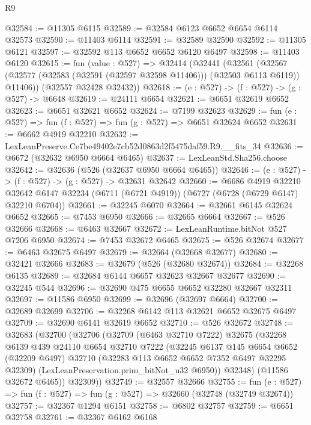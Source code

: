 \begin{lexlean}{R9}
\begin{coremodule}
@32584 := @11305 @6115
@32589 := @32584 @6123 @6652 @6654 @6114 @32573
@32590 := @11403 @6114
@32591 := @32589 @32590
@32592 := @11305 @6121
@32597 := @32592 @113 @6652 @6652 @6120 @6497
@32598 := @11403 @6120
@32615 := fun (value : @527) =>
  @32414
    (@32441
      (@32561
        (@32567 (@32577 (@32583 (@32591 (@32597 @32598 @11406))) (@32503 @6113 @6119)) @11406))
      (@32557 @32428 @32432))
@32618 := (e : @527) -> (f : @527) -> (g : @527) -> @6648
@32619 := @24111 @6654
@32621 := @6651 @32619 @6652
@32623 := @6651 @32621 @6652
@32624 := @7199 @32623
@32629 := fun (e : @527) => fun (f : @527) => fun (g : @527) => @6651 @32624 @6652
@32631 := @6662 @4919 @32210
@32632 := LexLeanPreserve.Ce7be49402e7cb52d0863d2f5475daf59.R9.__fits_34
@32636 := @6672 (@32632 @6950 @6664 @6465)
@32637 := LexLeanStd.Sha256.choose
@32642 := @32636 (@526 (@32637 @6950 @6664 @6465))
@32646 := (e : @527) -> (f : @527) -> (g : @527) -> @32631 @32642
@32660 := @6686
    @4919
    @32210
    @32642
    @6147
    @32234
    (@6711 (@6721 @4919))
    (@6727 (@6728 (@6729 @6147) @32210 @6704))
@32661 := @32245 @6070
@32664 := @32661 @6145 @32624 @6652
@32665 := @7453 @6950
@32666 := @32665 @6664
@32667 := @526 @32666
@32668 := @6463 @32667
@32672 := LexLeanRuntime.bitNot @527 @7206 @6950
@32674 := @7453 @32672 @6465
@32675 := @526 @32674
@32677 := @6463 @32675 @6497
@32679 := @32664 (@32668 @32677)
@32680 := @32421 @32666
@32683 := @32679 (@526 (@32680 @32674))
@32684 := @32268 @6135
@32689 := @32684 @6144 @6657 @32623 @32667 @32677
@32690 := @32245 @544
@32696 := @32690 @475 @6655 @6652 @32280 @32667 @32311
@32697 := @11586 @6950
@32699 := @32696 (@32697 @6664)
@32700 := @32689 @32699
@32706 := @32268 @6142 @113 @32621 @6652 @32675 @6497
@32709 := @32690 @6141 @32619 @6652
@32710 := @526 @32672
@32748 := @32683
    (@32700
      (@32706
        (@32709
          (@6463 @32710 @7222)
          @32675
          (@32268
            @6139
            @439
            @24110
            @6654
            @32710
            @7222
            (@32245
              @6137
              @145
              @6654
              @6652
              (@32209 @6497)
              @32710
              (@32283 @113 @6652 @6652 @7352 @6497 @32295 @32309)
              (LexLeanPreservation.prim_bitNot_u32 @6950))
            @32348)
          (@11586 @32672 @6465))
        @32309))
@32749 := @32557 @32666
@32755 := fun (e : @527) => fun (f : @527) => fun (g : @527) => @32660 (@32748 (@32749 @32674))
@32757 := @32367 @1294 @6151
@32758 := @6802 @32757
@32759 := @6651 @32758
@32761 := @32367 @6162 @6168

\end{coremodule}
\end{lexlean}

